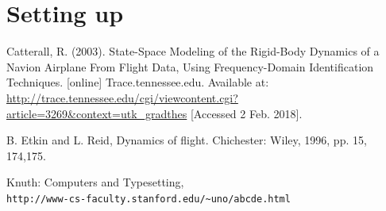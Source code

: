 \documentclass[
11pt, %
english, %
singlespacing, %
headsepline, %
] %
{MastersDoctoralThesis}
\renewcommand\bibname{References}
\begin{document}
\chapter{Setting up}
\thispagestyle{fancy}
\newpage
\renewcommand{\bibname}{References}
\begin{thebibliography}{9}
Catterall, R. (2003). State-Space Modeling of the Rigid-Body Dynamics of a Navion Airplane From Flight Data, Using Frequency-Domain Identification Techniques. [online] Trace.tennessee.edu. Available at: \url{http://trace.tennessee.edu/cgi/viewcontent.cgi?article=3269&context=utk_gradthes} [Accessed 2 Feb. 2018].
 

B. Etkin and L. Reid, Dynamics of flight. Chichester: Wiley, 1996, pp. 15, 174,175.
 
Knuth: Computers and Typesetting,
\\\texttt{http://www-cs-faculty.stanford.edu/\~{}uno/abcde.html}
\end{thebibliography}

\appendix %



%
%
\end{document}
